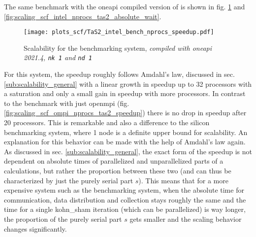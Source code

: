 \documentclass[main.tex]{subfiles}
\begin{document}
The same benchmark with the \gls{oneapi} compiled version of \QE is shown in fig. \ref{fig:scaling_scf_intel_nprocs_tas2_speedup} and \ref{fig:scaling_scf_intel_nprocs_tas2_absolute_wait}.
\begin{figure}[ht!]
    \centering
    \texttt{[image: plots\_scf/TaS2\_intel\_bench\_nprocs\_speedup.pdf]}
    \caption{Scalability for the \TaS benchmarking system, \emph{ compiled with \gls{oneapi} 2021.4, \texttt{nk 1} and \texttt{nd 1}}}
    \label{fig:scaling_scf_intel_nprocs_tas2_speedup}
\end{figure}
For this system, the speedup roughly follows Amdahl's law, discussed in sec. \ref{sub:scalability_general} with a linear growth in speedup up to 32 processors with a saturation and only a small gain in speedup with more processors.
In contrast to the benchmark with just \gls{openmpi} (fig. \ref{fig:scaling_scf_ompi_nprocs_tas2_speedup}) there is no drop in speedup after 20 processors.
This is remarkable and also a difference to the silicon benchmarking system, where 1 node is a definite upper bound for scalability.
An explanation for this behavior can be made with the help of Amdahl's law again.
As discussed in sec. \ref{sub:scalability_general}, the exact form of the speedup is not dependent on absolute times of parallelized and unparallelized parts of a calculations, but rather the proportion between these two (and can thus be characterized by just the purely serial part \(s\)).
This means that for a more expensive system such as the \TaS benchmarking system, when the absolute time for communication, data distribution and collection stays roughly the same and the time for a single \gls{kohn_sham} iteration (which can be parallelized) is way longer, the proportion of the purely serial part \(s\) gets smaller and the scaling behavior changes significantly.
\end{document}
